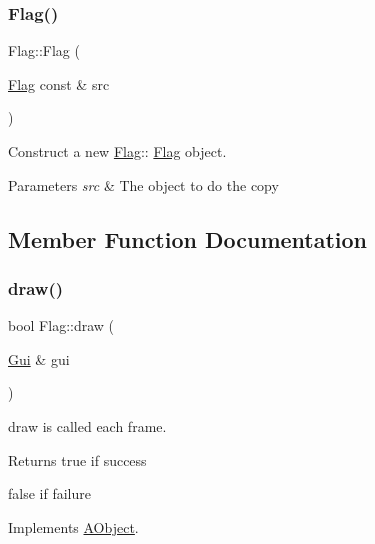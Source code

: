 \subsubsection{\texorpdfstring{Flag()}{Flag()}\hspace{0.1cm}{\footnotesize\ttfamily [2/2]}}
{\footnotesize\ttfamily Flag\+::\+Flag (\begin{DoxyParamCaption}\item[{\hyperlink{class_flag}{Flag} const \&}]{src }\end{DoxyParamCaption})}



Construct a new \hyperlink{class_flag}{Flag}\+:\+: \hyperlink{class_flag}{Flag} object. 


\begin{DoxyParams}{Parameters}
{\em src} & The object to do the copy \\
\hline
\end{DoxyParams}


\subsection{Member Function Documentation}
\mbox{\label{class_flag_ae24cc9c0e3cc3378e12af9f40c0ee93d}} 
\subsubsection{\texorpdfstring{draw()}{draw()}}
{\footnotesize\ttfamily bool Flag\+::draw (\begin{DoxyParamCaption}\item[{\hyperlink{class_gui}{Gui} \&}]{gui }\end{DoxyParamCaption})\hspace{0.3cm}{\ttfamily [virtual]}}



draw is called each frame. 

\begin{DoxyReturn}{Returns}
true if success 

false if failure 
\end{DoxyReturn}


Implements \hyperlink{class_a_object_a5e454e13e04ee937c20a465244cf748a}{A\+Object}.

\mbox{\label{class_flag_abdb7a9ef47dd6ea6a24beec99b372f11}} 

